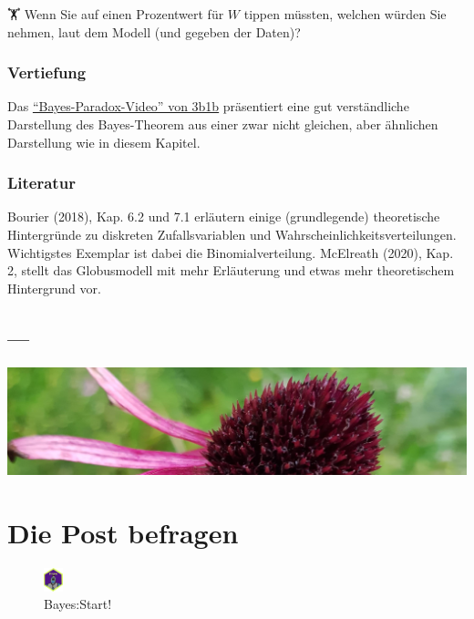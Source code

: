 \documentclass[
  a4paper,
  DIV=11]{scrreprt}
\theoremstyle{definition}
\theoremstyle{remark}
\begin{document}
🏋️ Wenn Sie auf einen Prozentwert für \(W\) tippen müssten, welchen
würden Sie nehmen, laut dem Modell (und gegeben der Daten)?

\hypertarget{vertiefung-1}{%
\subsection{Vertiefung}\label{vertiefung-1}}

Das \href{https://youtu.be/lG4VkPoG3ko}{``Bayes-Paradox-Video'' von
3b1b} präsentiert eine gut verständliche Darstellung des Bayes-Theorem
aus einer zwar nicht gleichen, aber ähnlichen Darstellung wie in diesem
Kapitel.

\hypertarget{literatur-2}{%
\subsection{Literatur}\label{literatur-2}}

Bourier (2018), Kap. 6.2 und 7.1 erläutern einige (grundlegende)
theoretische Hintergründe zu diskreten Zufallsvariablen und
Wahrscheinlichkeitsverteilungen. Wichtigstes Exemplar ist dabei die
Binomialverteilung. McElreath (2020), Kap. 2, stellt das Globusmodell
mit mehr Erläuterung und etwas mehr theoretischem Hintergrund vor.

\hypertarget{section-4}{%
\section{---}\label{section-4}}

\includegraphics[width=1\textwidth,height=\textheight]{./img/outro-05.jpg}


\hypertarget{die-post-befragen}{%
\chapter{Die Post befragen}\label{die-post-befragen}}

\begin{figure}

{\centering \includegraphics[width=0.05\textwidth,height=\textheight]{./img/Golem_hex.png}

}

\caption{Bayes:Start!}

\end{figure}
\end{document}
